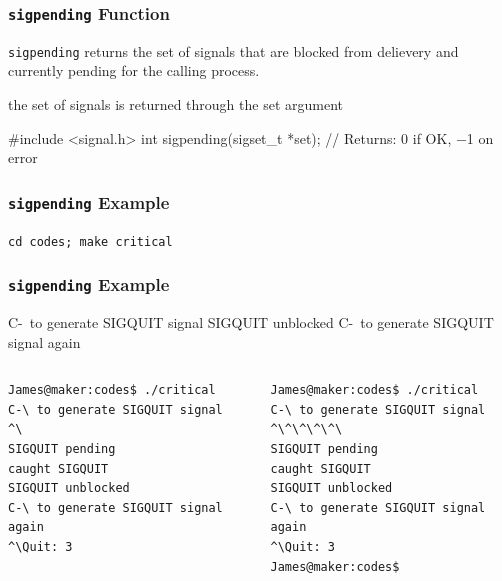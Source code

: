 \documentclass[newPxFont,sthlmFooter,nooffset]{beamer}
\begin{document}
\begin{frame}[fragile,t]
  \frametitle{\texttt{sigpending} Function}

\texttt{sigpending} returns the set of signals that are blocked from delievery and currently pending for the calling process.

the set of signals is returned through the set argument
\begin{codedef}
#include <signal.h>
int sigpending(sigset_t *set);
// Returns: 0 if OK, −1 on error
\end{codedef}
\end{frame}




\begin{frame}
  \frametitle{\texttt{sigpending} Example}

\texttt{cd codes; make critical}


\end{frame}




\begin{frame}[fragile,t]
  \frametitle{\texttt{sigpending} Example}
C-\ to generate SIGQUIT signal
SIGQUIT unblocked
C-\ to generate SIGQUIT signal again

\begin{columns}[t]
\begin{column}{0.5\linewidth}
{\footnotesize
\begin{verbatim}
James@maker:codes$ ./critical
C-\ to generate SIGQUIT signal
^\
SIGQUIT pending
caught SIGQUIT
SIGQUIT unblocked
C-\ to generate SIGQUIT signal again
^\Quit: 3
\end{verbatim}
}
\end{column}
\begin{column}{0.5\linewidth}
{\footnotesize
\begin{verbatim}
James@maker:codes$ ./critical
C-\ to generate SIGQUIT signal
^\^\^\^\^\
SIGQUIT pending
caught SIGQUIT
SIGQUIT unblocked
C-\ to generate SIGQUIT signal again
^\Quit: 3
James@maker:codes$
\end{verbatim}
}
\end{column}
\end{columns}




\end{frame}
\end{document}
